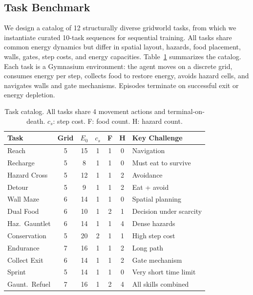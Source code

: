 \documentclass[sigplan,10pt]{acmart}
\newcommand{\energy}{E}
\begin{document}
\subsection{Task Benchmark}

We design a catalog of 12 structurally diverse gridworld tasks, from
which we instantiate curated 10-task sequences for sequential training.
All tasks share common energy dynamics but differ in spatial layout,
hazards, food placement, walls, gates, step costs, and energy capacities.
Table~\ref{tab:tasks} summarizes the catalog.  Each task is a Gymnasium
environment: the agent moves on a discrete grid, consumes energy per
step, collects food to restore energy, avoids hazard cells, and
navigates walls and gate mechanisms.  Episodes terminate on successful
exit or energy depletion.

\begin{table}[t]
\centering
\caption{Task catalog.  All tasks share 4 movement actions and
terminal-on-death.  $c_s$: step cost.  F: food count.  H: hazard count.}
\label{tab:tasks}
\small
\setlength{\tabcolsep}{3.8pt}
\begin{tabular}{@{}lcccccl@{}}
\toprule
\textbf{Task} & \textbf{Grid} & $\energy_0$ & $c_s$ &
\textbf{F} & \textbf{H} & \textbf{Key Challenge} \\
\midrule
Reach          & 5 & 15 & 1 & 1 & 0 & Navigation \\
Recharge       & 5 &  8 & 1 & 1 & 0 & Must eat to survive \\
Hazard Cross   & 5 & 12 & 1 & 1 & 2 & Avoidance \\
Detour         & 5 &  9 & 1 & 1 & 2 & Eat + avoid \\
Wall Maze      & 6 & 14 & 1 & 1 & 0 & Spatial planning \\
Dual Food      & 6 & 10 & 1 & 2 & 1 & Decision under scarcity \\
Haz.~Gauntlet  & 6 & 14 & 1 & 1 & 4 & Dense hazards \\
Conservation   & 5 & 20 & 2 & 1 & 1 & High step cost \\
Endurance      & 7 & 16 & 1 & 1 & 2 & Long path \\
Collect Exit   & 6 & 14 & 1 & 1 & 2 & Gate mechanism \\
Sprint         & 5 & 14 & 1 & 1 & 0 & Very short time limit \\
Gaunt.~Refuel  & 7 & 16 & 1 & 2 & 4 & All skills combined \\
\bottomrule
\end{tabular}
\end{table}
\end{document}
